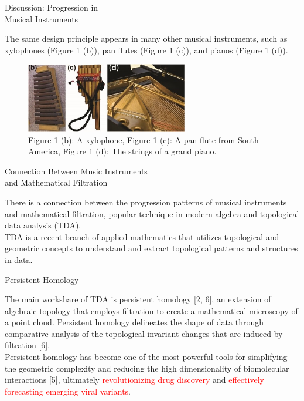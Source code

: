 \documentclass[aspectratio=169,xcolor=dvipsnames]{beamer}
\begin{document}
\begin{frame}{Discussion: Progression in \\Musical Instruments}
\begin{scriptsize}
    The same design principle appears in many other musical instruments, such as xylophones (Figure 1 (b)), pan flutes (Figure 1 (c)), and pianos (Figure 1 (d)).
\end{scriptsize}
\begin{figure}[!ht]
\label{musical_instrument}
 \centering
 \includegraphics[width=200pt]{images/bcd.jpeg}
 \caption{Figure 1 (b): A xylophone, Figure 1 (c): A pan flute from South America, Figure 1 (d): The strings of a grand piano.}
 \end{figure}
\end{frame}

\begin{frame}{Connection Between Music Instruments \\and Mathematical Filtration}
\begin{small}
    There is a connection between the progression patterns of musical instruments and mathematical filtration, popular technique in modern algebra and topological data analysis (TDA).\\
    \vspace{1.5em}
    TDA is a recent branch of applied mathematics that utilizes topological and geometric concepts to understand and extract topological patterns and structures in data.
\end{small}
\end{frame}


\begin{frame}{Persistent Homology}
\begin{small}
The main workshare of TDA is persistent homology [2, 6], an extension of algebraic topology that employs filtration to create a mathematical microscopy of a point cloud. Persistent homology delineates the shape of data through comparative analysis of the topological invariant changes that are induced by filtration [6]. \\
\vspace{1.5em}
Persistent homology has become one of the most powerful tools for simplifying the geometric complexity and reducing the high dimensionality of biomolecular interactions [5], ultimately \textcolor{red}{revolutionizing drug discovery} and \textcolor{red}{effectively forecasting emerging viral variants}.
\end{small}
\end{frame}
\end{document}
